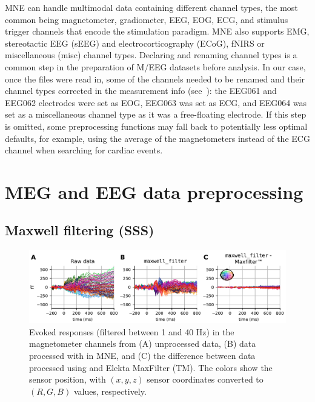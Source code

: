 MNE can handle multimodal data containing different channel types, the most common being magnetometer, gradiometer, \ac{EEG}, \ac{EOG}, \ac{ECG}, and stimulus trigger channels that encode the stimulation paradigm. MNE also supports \ac{EMG}, stereotactic EEG (sEEG) and electrocorticography (ECoG), \ac{fNIRS} or miscellaneous (misc) channel types. Declaring and renaming channel types is a common step in the preparation of M/EEG datasets before analysis. In our case, once the files were read in, some of the channels needed to be renamed and their channel types corrected in the measurement info (see~\citep{wakeman2015multi}): the EEG061 and EEG062 electrodes were set as EOG, EEG063 was set as ECG, and EEG064 was set as a miscellaneous channel type as it was a free-floating electrode. If this step is omitted, some preprocessing functions may fall back to potentially less optimal defaults, for example, using the average of the magnetometers instead of the ECG channel when searching for cardiac events.

\section{MEG and EEG data preprocessing}

\subsection{Maxwell filtering (SSS)}
\label{sec:maxfilter}

\begin{figure}[htb]
        \centering
        \includegraphics{figures/Maxfilter.pdf}
        \caption[Comparison of Elekta MaxFilter (TM) and MNE implementation]{Evoked responses (filtered between 1 and 40 Hz) in the magnetometer channels from (A) unprocessed data, (B) data processed with  in MNE, and (C) the difference between data processed using  and Elekta MaxFilter (TM). The colors show the sensor position, with $(x, y, z)$ sensor coordinates converted to $(R, G, B)$ values, respectively.}
        \label{fig:fig_maxwell}
\end{figure}

